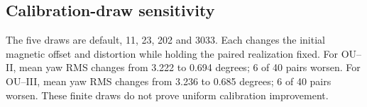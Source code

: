 \subsection{Calibration-draw sensitivity}
The five draws are default, 11, 23, 202 and 3033. Each changes the initial
magnetic offset and distortion while holding the paired realization fixed.
For OU--II, mean yaw RMS changes from 3.222 to 0.694 degrees; 6 of 40 pairs worsen.
For OU--III, mean yaw RMS changes from 3.236 to 0.685 degrees; 6 of 40 pairs worsen.
These finite draws do not prove uniform calibration improvement.
